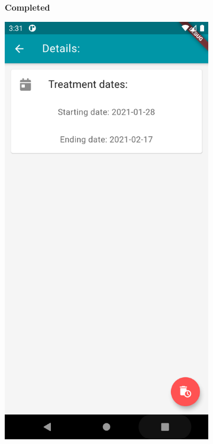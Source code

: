 \documentclass [12pt]{article}
\begin{document}
\begin{description}[leftmargin=1cm,rightmargin=1cm]
\begin{figure}[h!]
\begin{subfigure}[tr]{0.3\linewidth}
\caption{\textbf{Completed }}
\end{subfigure}
\hspace*{\fill}
\begin{subfigure}[tr]{0.3\linewidth}
\includegraphics[width=\linewidth]{treatments3.PNG}

\end{subfigure}
\end{figure}
\end{description}
\end{document}
